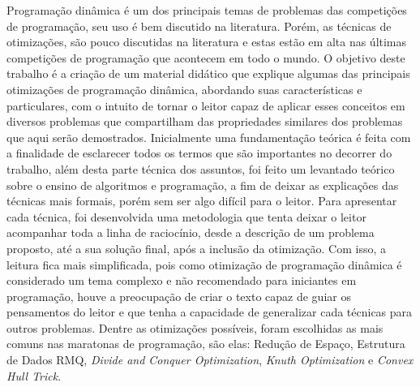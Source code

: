 \begin{resumo}
Programação dinâmica é um dos principais temas de problemas das competições de programação, seu uso é bem discutido na literatura. Porém, as técnicas de otimizações, são pouco discutidas na literatura e estas estão em alta nas últimas competições de programação que acontecem em todo o mundo. O objetivo deste trabalho é a criação de um material didático que explique algumas das principais otimizações de programação dinâmica, abordando suas características e particulares, com o intuito de tornar o leitor capaz de aplicar esses conceitos em diversos problemas que compartilham das propriedades similares dos problemas que aqui serão demostrados. Inicialmente uma fundamentação teórica é feita com a finalidade de esclarecer todos os termos que são importantes no decorrer do trabalho, além desta parte técnica dos assuntos, foi feito um levantado teórico sobre o ensino de algoritmos e programação, a fim de deixar as explicações das técnicas mais formais, porém sem ser algo difícil para o leitor. Para apresentar cada técnica, foi desenvolvida uma metodologia que tenta deixar o leitor acompanhar toda a linha de raciocínio, desde a descrição de um problema proposto, até a sua solução final, após a inclusão da otimização. Com isso, a leitura fica mais simplificada, pois como otimização de programação dinâmica é considerado um tema complexo e não recomendado para iniciantes em programação, houve a preocupação de criar o texto capaz de guiar os pensamentos do leitor e que tenha a capacidade de generalizar cada técnicas para outros problemas. Dentre as otimizações possíveis, foram escolhidas as mais comuns nas maratonas de programação, são elas: Redução de Espaço, Estrutura de Dados RMQ, \textit{Divide and Conquer Optimization}, \textit{Knuth Optimization} e \textit{Convex Hull Trick}.
\end{resumo}	
